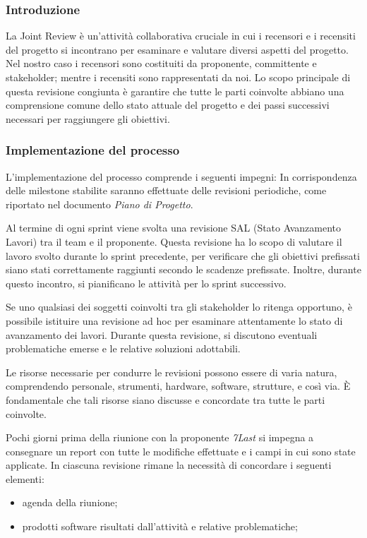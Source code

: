 \subsubsection{Introduzione}
La Joint Review è un'attività collaborativa cruciale in cui i recensori e i recensiti del progetto si incontrano per esaminare e valutare diversi aspetti del progetto.  Nel nostro caso i recensori sono costituiti da proponente, committente e stakeholder; mentre i recensiti sono rappresentati da noi. Lo scopo principale di questa revisione congiunta è garantire che tutte le parti coinvolte abbiano una comprensione comune dello stato attuale del progetto e dei passi successivi necessari per raggiungere gli obiettivi.

\subsubsection{Implementazione del processo}
L'implementazione del processo comprende i seguenti impegni:
In corrispondenza delle milestone stabilite saranno effettuate delle revisioni periodiche, come riportato nel
documento \textit{Piano di Progetto}.

Al termine di ogni sprint viene svolta una revisione SAL
(Stato Avanzamento Lavori) tra il team e il proponente. Questa revisione ha lo scopo di valutare il lavoro svolto durante lo sprint precedente, per verificare che gli obiettivi prefissati siano stati correttamente raggiunti secondo le scadenze prefissate.
Inoltre, durante questo incontro, si pianificano le attività per lo sprint successivo.

Se uno qualsiasi dei soggetti coinvolti tra gli stakeholder lo ritenga opportuno, è possibile istituire una revisione ad hoc per esaminare attentamente lo stato di avanzamento dei lavori. Durante questa revisione, si discutono eventuali problematiche emerse e le relative soluzioni adottabili.

Le risorse necessarie per condurre le revisioni possono essere di varia natura, comprendendo personale, strumenti, hardware, software, strutture, e così via. È fondamentale che tali risorse siano discusse e concordate tra tutte le parti coinvolte.

Pochi giorni prima della riunione con la proponente \textit{7Last} si impegna a consegnare un report con tutte le modifiche effettuate e i campi in cui sono state applicate.
In ciascuna revisione rimane la necessità di concordare i seguenti elementi:
\begin{itemize}
	\item agenda della riunione;
	\item prodotti software risultati dall'attività e relative problematiche;
\end{itemize}

